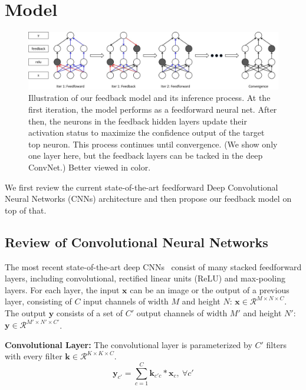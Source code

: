 \section{Model}
\label{sec:model}

\setlength{\tabcolsep}{2pt}
\begin{figure}
\begin{center}
\includegraphics[width=0.95\linewidth]{figs/model/model}
\caption{Illustration of our feedback model and its inference process. At the first iteration, the model performs as a feedforward neural net. After then, the neurons in the feedback hidden layers update their activation status to maximize the confidence output of the target top neuron. This process continues until convergence. (We show only one layer here, but the feedback layers can be tacked in the deep ConvNet.) Better viewed in color.}
\label{fig:model}
\end{center}
\end{figure}

We first review the current state-of-the-art feedforward Deep Convolutional Neural Networks (CNNs) architecture and then propose our feedback model on top of that. 

\subsection{Review of Convolutional Neural Networks}
The most recent state-of-the-art deep CNNs~\cite{Simonyan2014Very} consist of many stacked feedforward layers, including convolutional, rectified linear units (ReLU) and max-pooling layers. For each layer, the input $\mathbf{x}$ can be an image or the output of a previous layer, consisting of $C$ input channels of width $M$ and height $N$: $\mathbf{x} \in \mathcal{R}^{M \times N \times C}$. The output $\mathbf{y}$ consists of a set of $C'$ output channels of width $M'$ and height $N'$: $\mathbf{y} \in \mathcal{R}^{M' \times N' \times C'}$. 

\textbf{Convolutional Layer:} 
The convolutional layer is parameterized by $C'$ filters with every filter $\mathbf{k} \in \mathcal{R}^{K \times K \times C}$.
\begin{equation}
\mathbf{y}_{c'} = \sum_{c=1}^C \mathbf{k}_{c'c} * \mathbf{x}_c,\ \forall c'
\end{equation}

